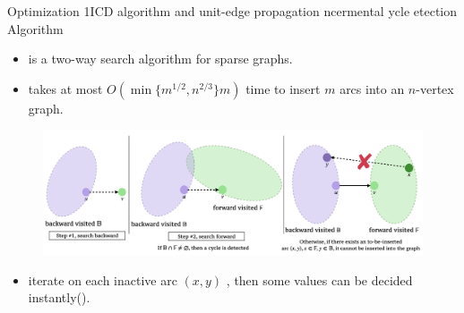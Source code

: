 \begin{frame}{Optimization 1}{ICD algorithm and unit-edge propagation}
	ncermental ycle etection Algorithm
	\begin{itemize}
		\item is a two-way search algorithm for sparse graphs.
		\item takes at most $O(\min\{m^{1/2}, n^{2/3}\}m)$ time to insert $m$ arcs into an $n$-vertex graph.
	\end{itemize}

	\begin{figure}[H]
		\centering
		\includegraphics[width=\textwidth]{figs/ICD-algorithm-and-unit-edge-propagation.png}
	\end{figure}

	\begin{itemize}
		\item iterate on each inactive arc $(x, y)$ , then some values can be decided instantly(). 
	\end{itemize}
\end{frame}

